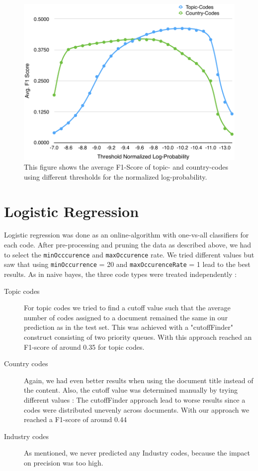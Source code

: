 \documentclass{article}
\begin{document}
\begin{figure}[h!]
    \centering
    \includegraphics[scale=0.6]{graphics/BayesF1ScoreTopicCountry.pdf}
    \caption{This figure shows the average F1-Score of topic- and country-codes using different thresholds for the normalized log-probability.}
    \label{fig_bayesThreshold}
\end{figure}

\section*{Logistic Regression}
    Logistic regression was done as an online-algorithm with one-vs-all classifiers for each code. After pre-processing and pruning the data as described above, we had to select the \texttt{minOcccurence} and \texttt{maxOccurence} rate. We tried different values but saw that using \texttt{minOccurrence} = 20 and \texttt{maxOccurenceRate} = 1 lead to the best results.
    As in naive bayes, the three code types were treated independently :
    \begin{description}
    \item[Topic codes] For topic codes we tried to find a cutoff value such that the average number of codes assigned to a document remained the same in our prediction as in the test set. This was achieved with a "cutoffFinder" construct consisting of two priority queues. With this approach reached an F1-score of around 0.35 for topic codes.
    \item[Country codes] Again,  we had even better results when using the document title instead of the content. Also, the cutoff value was determined manually by trying different values : The cutoffFinder approach lead to worse results since a codes were distributed unevenly across documents. With our approach we reached a F1-score of around 0.44
    \item[Industry codes] As mentioned, we never predicted any Industry codes, because the impact on precision was too high.
    \end{description}
\end{document}
